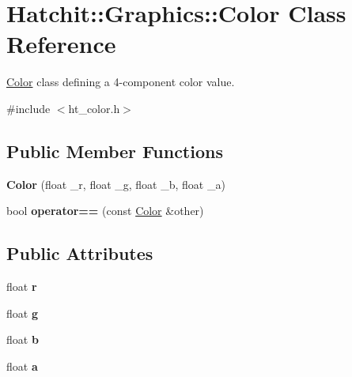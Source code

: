 \hypertarget{classHatchit_1_1Graphics_1_1Color}{}\section{Hatchit\+:\+:Graphics\+:\+:Color Class Reference}
\label{classHatchit_1_1Graphics_1_1Color}


\hyperlink{classHatchit_1_1Graphics_1_1Color}{Color} class defining a 4-\/component color value.  




{\ttfamily \#include $<$ht\+\_\+color.\+h$>$}

\subsection*{Public Member Functions}
\begin{DoxyCompactItemize}
\item 
{\bfseries Color} (float \+\_\+r, float \+\_\+g, float \+\_\+b, float \+\_\+a)\hypertarget{classHatchit_1_1Graphics_1_1Color_a59daebdc2567acd1d6016ba8b5691124}{}\label{classHatchit_1_1Graphics_1_1Color_a59daebdc2567acd1d6016ba8b5691124}

\item 
bool {\bfseries operator==} (const \hyperlink{classHatchit_1_1Graphics_1_1Color}{Color} \&other)\hypertarget{classHatchit_1_1Graphics_1_1Color_a26f19e3305e83264d1ea7e1f8763555d}{}\label{classHatchit_1_1Graphics_1_1Color_a26f19e3305e83264d1ea7e1f8763555d}

\end{DoxyCompactItemize}
\subsection*{Public Attributes}
\begin{DoxyCompactItemize}
\item 
float {\bfseries r}\hypertarget{classHatchit_1_1Graphics_1_1Color_a89fa14abd8e3182e9bd34deb5545c005}{}\label{classHatchit_1_1Graphics_1_1Color_a89fa14abd8e3182e9bd34deb5545c005}

\item 
float {\bfseries g}\hypertarget{classHatchit_1_1Graphics_1_1Color_a80030198620f97462dfd1e48e94c403e}{}\label{classHatchit_1_1Graphics_1_1Color_a80030198620f97462dfd1e48e94c403e}

\item 
float {\bfseries b}\hypertarget{classHatchit_1_1Graphics_1_1Color_ace39573cecae4b556b415190f3e72ca6}{}\label{classHatchit_1_1Graphics_1_1Color_ace39573cecae4b556b415190f3e72ca6}

\item 
float {\bfseries a}\hypertarget{classHatchit_1_1Graphics_1_1Color_a69073bb6afe1270d1b8743404b3ba778}{}\label{classHatchit_1_1Graphics_1_1Color_a69073bb6afe1270d1b8743404b3ba778}

\end{DoxyCompactItemize}


